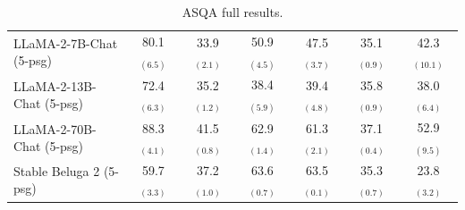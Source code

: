 \documentclass[11pt]{article}
\newcommand{\vani}{{\sc{Vanilla}}}
\begin{document}
\begin{table}[h]
\begin{tabular}{lcccccc}
            \midrule
            LLaMA-2-7B-Chat \vani{} (5-psg) & 80.1 $_{(6.5)}$ & 33.9 $_{(2.1)}$ & 50.9 $_{(4.5)}$ & 47.5 $_{(3.7)}$ & 35.1 $_{(0.9)}$ & 42.3 $_{(10.1)}$\\
            LLaMA-2-13B-Chat \vani{} (5-psg)  & 72.4 $_{(6.3)}$ & 35.2 $_{(1.2)}$ & 38.4 $_{(5.9)}$ & 39.4 $_{(4.8)}$ & 35.8 $_{(0.9)}$ & 38.0 $_{(6.4)}$\\
            LLaMA-2-70B-Chat \vani{} (5-psg)  & 88.3 $_{(4.1)}$ & 41.5 $_{(0.8)}$ & 62.9 $_{(1.4)}$ & 61.3 $_{(2.1)}$ & 37.1 $_{(0.4)}$ & 52.9 $_{(9.5)}$\\
            \midrule
            Stable Beluga 2 \vani{} (5-psg) & 59.7 $_{(3.3)}$&37.2 $_{(1.0)}$&63.6 $_{(0.7)}$&63.5 $_{(0.1)}$&35.3 $_{(0.7)}$&23.8 $_{(3.2)}$\\
            \bottomrule
        \end{tabular}
    \caption{
        ASQA full results. %
    }
    \label{tab:asqa_full}
\end{table}



\end{document}
